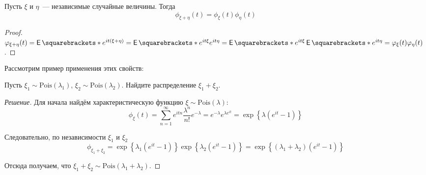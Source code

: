 \begin{property}
	Пусть \(\xi\) и \(\eta\)~--- независимые случайные величины. Тогда
	\[
		\phi_{\xi + \eta}(t) = \phi_{\xi}(t)\phi_{\eta}(t)
	\]
\end{property}
\begin{proof}
	\(\phi_{\xi + \eta}(t) = \E{e^{it(\xi + \eta)}} = \E{e^{it\xi}e^{it\eta}} = \E{e^{it\xi}}\E{e^{it\eta}} = \phi_{\xi}(t)\phi_{\eta}(t)\).
\end{proof}

Рассмотрим пример применения этих свойств:
\begin{problem}
	Пусть \(\xi_1 \sim \mathrm{Pois}(\lambda_1)\), \(\xi_2 \sim \mathrm{Pois}(\lambda_2)\). Найдите распределение \(\xi_1 + \xi_2\).
\end{problem}
\begin{proof}[Решение]
	Для начала найдём характеристическую функцию \(\xi \sim \mathrm{Pois}(\lambda)\):
	\[
		\phi_{\xi}(t) = \sum_{n = 1}^{\infty} e^{itn}\frac{\lambda^n}{n!}e^{-\lambda} = e^{-\lambda}e^{\lambda e^{it}} = \exp\left\{\lambda(e^{it} - 1)\right\}
	\]
	
	Следовательно, по независимости \(\xi_1\) и \(\xi_2\)
	\[
		\phi_{\xi_1 + \xi_2} = \exp\left\{\lambda_1(e^{it} - 1)\right\}\exp\left\{\lambda_2(e^{it} - 1)\right\} = \exp\left\{(\lambda_1 + \lambda_2)(e^{it} - 1)\right\}
	\]
	
	Отсюда получаем, что \(\xi_1 + \xi_2 \sim \mathrm{Pois}(\lambda_1 + \lambda_2)\).
\end{proof}